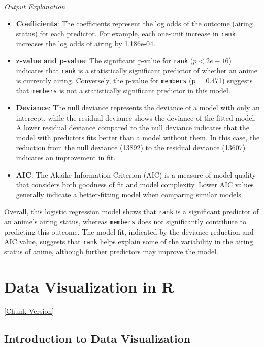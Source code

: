 \documentclass[
]{book}
\providecommand{\tightlist}{%
  \setlength{\itemsep}{0pt}\setlength{\parskip}{0pt}}
\begin{document}
\emph{Output Explanation}

\begin{itemize}
\tightlist
\item
  \textbf{Coefficients}: The coefficients represent the log odds of the outcome (airing status) for each predictor. For example, each one-unit increase in \texttt{rank} increases the log odds of airing by 1.186e-04.
\item
  \textbf{z-value and p-value}: The significant p-value for \texttt{rank} (\(p < 2e-16\)) indicates that \texttt{rank} is a statistically significant predictor of whether an anime is currently airing. Conversely, the p-value for \texttt{members} (p = 0.471) suggests that \texttt{members} is not a statistically significant predictor in this model.
\item
  \textbf{Deviance}: The null deviance represents the deviance of a model with only an intercept, while the residual deviance shows the deviance of the fitted model. A lower residual deviance compared to the null deviance indicates that the model with predictors fits better than a model without them. In this case, the reduction from the null deviance (13892) to the residual deviance (13607) indicates an improvement in fit.
\item
  \textbf{AIC}: The Akaike Information Criterion (AIC) is a measure of model quality that considers both goodness of fit and model complexity. Lower AIC values generally indicate a better-fitting model when comparing similar models.
\end{itemize}

Overall, this logistic regression model shows that \texttt{rank} is a significant predictor of an anime's airing status, whereas \texttt{members} does not significantly contribute to predicting this outcome. The model fit, indicated by the deviance reduction and AIC value, suggests that \texttt{rank} helps explain some of the variability in the airing status of anime, although further predictors may improve the model.

\chapter{Data Visualization in R}\label{data-visualization-in-r}

\href{files/11-data_visualization-chunk.Rmd}{{[}Chunk Version{]}}

\section{Introduction to Data Visualization}\label{introduction-to-data-visualization}
\end{document}
